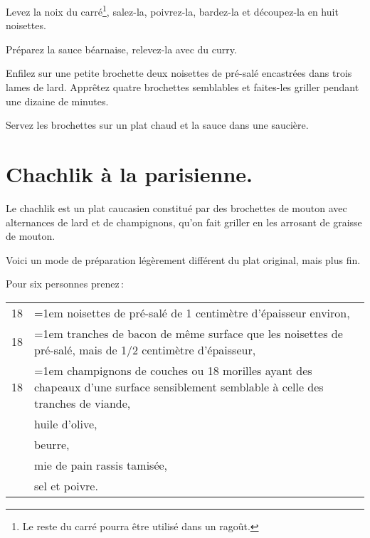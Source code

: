 Levez la noix du carré\footnote{Le reste du carré pourra être utilisé dans un
ragoût.}, salez-la, poivrez-la, bardez-la et découpez-la en huit noisettes.

Préparez la sauce béarnaise, relevez-la avec du curry.

Enfilez sur une petite brochette deux noisettes de pré-salé encastrées dans
trois lames de lard. Apprêtez quatre brochettes semblables et faites-les
griller pendant une dizaine de minutes.

Servez les brochettes sur un plat chaud et la sauce dans une saucière.

\section*{\centering Chachlik à la parisienne.}
{}

Le chachlik est un plat caucasien constitué par des brochettes de mouton avec
alternances de lard et de champignons, qu'on fait griller en les arrosant de
graisse de mouton.

Voici un mode de préparation légèrement différent du plat original, mais plus fin.

Pour six personnes prenez :

\medskip

\footnotesize
\begin{tabular}{rp{22em}}
\hspace{4em}18 & \hangindent=1em noisettes de pré-salé de 1 centimètre d'épaisseur environ,               \\
\hspace{4em}18 & \hangindent=1em tranches de bacon de même surface que les noisettes de
                                 pré-salé, mais de 1/2 centimètre d'épaisseur,                            \\
\hspace{4em}18 & \hangindent=1em champignons de couches ou 18 morilles ayant des chapeaux
                                 d’une surface sensiblement semblable à celle des tranches de viande,     \\
\hspace{4em}   & huile d'olive,                                                                           \\
\hspace{4em}   & beurre,                                                                                  \\
\hspace{4em}   & mie de pain rassis tamisée,                                                              \\
\hspace{4em}   & sel et poivre.                                                                           \\
\end{tabular}
\normalsize

